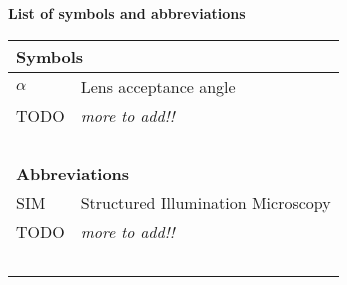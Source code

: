 
 \vspace*{3em} \thispagestyle{empty}
\begin {flushleft} 
	\huge \textbf{List of symbols and abbreviations} 
\end{flushleft} 
\vspace*{2em}

\begin{flushleft}
\begin{tabular}{|l|l|}
\hline 
\multicolumn{2}{|l|}{\textbf{Symbols}} \\
\hline 
$\alpha$ & Lens acceptance angle \\
TODO & \textit{more to add!!} \\
~ & ~ \\
\hline 
\multicolumn{2}{|l|}{\textbf{Abbreviations}} \\
\hline
SIM & Structured Illumination Microscopy \\
TODO & \textit{more to add!!} \\
~ & ~ \\
\hline
\end{tabular}
\end{flushleft}